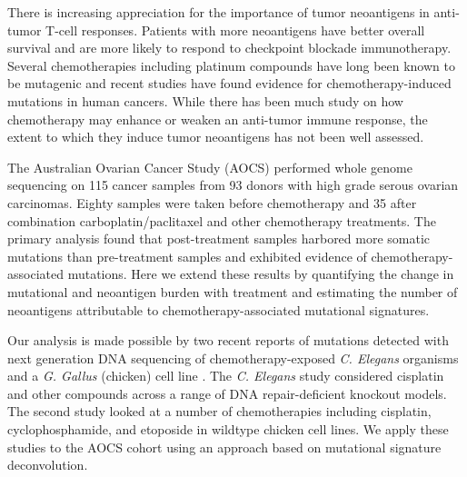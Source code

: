 There is increasing appreciation for the importance of tumor neoantigens in anti-tumor T-cell responses\cite{Schumacher_2015}. Patients with more neoantigens have better overall survival\cite{Brown_2014} and are more likely to respond to checkpoint blockade immunotherapy\cite{Van_Allen_2015,Rizvi_2015}. Several chemotherapies including platinum compounds have long been known to be mutagenic\cite{Hannan_1989} and recent studies have found evidence for chemotherapy-induced mutations in human cancers\cite{Murugaesu_2015,Johnson_2013}. While there has been much study on how chemotherapy may enhance\cite{Hato_2012,Machiels2001,Hodge2013} or weaken\cite{Litterman_2013} an anti-tumor immune response, the extent to which they induce tumor neoantigens has not been well assessed.

The Australian Ovarian Cancer Study (AOCS) performed whole genome sequencing on 115 cancer samples from 93 donors with high grade serous ovarian carcinomas\cite{Patch_2015}. Eighty samples were taken before chemotherapy and 35 after combination carboplatin/paclitaxel and other chemotherapy treatments. The primary analysis found that post-treatment samples harbored more somatic mutations than pre-treatment samples and exhibited evidence of chemotherapy-associated mutations. Here we extend these results by quantifying the change in mutational and neoantigen burden with treatment and estimating the number of neoantigens attributable to chemotherapy-associated mutational signatures.

Our analysis is made possible by two recent reports of mutations detected with next generation DNA sequencing of chemotherapy-exposed \textit{C. Elegans} organisms\cite{Meier_2014} and a \textit{G. Gallus} (chicken) cell line \cite{Szikriszt_2016}. The \textit{C. Elegans} study considered cisplatin and other compounds across a range of DNA repair-deficient knockout models. The second study looked at a number of chemotherapies including cisplatin, cyclophosphamide, and etoposide in wildtype chicken cell lines. We apply these studies to the AOCS cohort using an approach based on mutational signature deconvolution\cite{Alexandrov2013}. 

